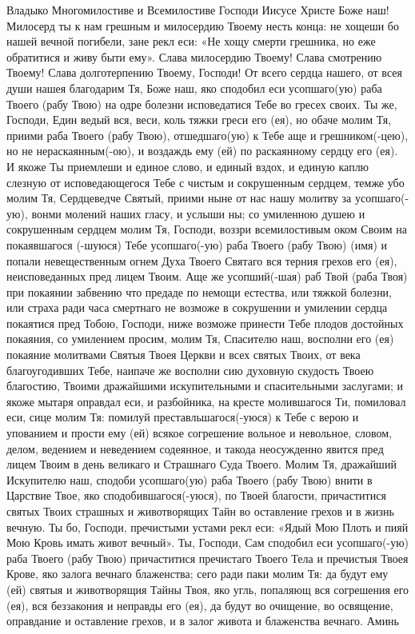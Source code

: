 \begin{mymulticols}


Владыко Многомилостиве и Всемилостиве Господи Иисусе Христе Боже наш! Милосерд ты к нам грешным и милосердию Твоему несть конца: не хощеши бо нашей вечной погибели, зане рекл еси: «Не хощу смерти грешника, но еже обратитися и живу быти ему». Слава милосердию Твоему! Слава смотрению Твоему! Слава долготерпению Твоему, Господи! От всего сердца нашего, от всея души нашея благодарим Тя, Боже наш, яко сподобил еси усопшаго(ую) раба Твоего (рабу Твою)  на одре болезни исповедатися Тебе во гресех своих. Ты же, Господи, Един ведый вся, веси, коль тяжки греси его (ея), но обаче молим Тя, приими раба Твоего (рабу Твою), отшедшаго(ую) к Тебе аще и грешником(-цею), но не нераскаянным(-ою), и воздаждь ему (ей) по раскаянному сердцу его (ея). И якоже Ты приемлеши и единое слово, и единый вздох, и единую каплю слезную от исповедающегося Тебе с чистым и сокрушенным сердцем, темже убо молим Тя, Сердцеведче Святый, приими ныне от нас нашу молитву за усопшаго(-ую), вонми молений наших гласу, и услыши ны; со умиленною душею и сокрушенным сердцем молим Тя, Господи, воззри всемилостивым оком Своим на покаявшагося (-шуюся) Тебе усопшаго(-ую) раба Твоего (рабу Твою) (имя) и попали невещественным огнем Духа Твоего Святаго вся терния грехов его (ея), неисповеданных пред лицем Твоим. Аще же усопший(-шая) раб Твой (раба Твоя) при покаянии забвению что предаде по немощи естества, или тяжкой болезни, или страха ради часа смертнаго не возможе в сокрушении и умилении сердца покаятися пред Тобою, Господи, ниже возможе принести Тебе плодов достойных покаяния, со умилением просим, молим Тя, Спасителю наш, восполни его (ея) покаяние молитвами Святыя Твоея Церкви и всех святых Твоих, от века благоугодивших Тебе, наипаче же восполни сию духовную скудость Твоею благостию, Твоими дражайшими искупительными и спасительными заслугами; и якоже мытаря оправдал еси, и разбойника, на кресте молившагося Ти, помиловал еси, сице молим Тя: помилуй преставльшагося(-уюся) к Тебе с верою и упованием и прости ему (ей) всякое согрешение вольное и невольное, словом, делом, ведением и неведением содеянное, и такода неосужденно явится пред лицем Твоим в день великаго и Страшнаго Суда Твоего. Молим Тя, дражайший Искупителю наш, сподоби усопшаго(ую) раба Твоего (рабу Твою)  внити в Царствие Твое, яко сподобившагося(-уюся), по Твоей благости, причаститися святых Твоих страшных и животворящих Тайн во оставление грехов и в жизнь вечную. Ты бо, Господи, пречистыми устами рекл еси: «Ядый Мою Плоть и пияй Мою Кровь имать живот вечный». Ты, Господи, Сам сподобил еси усопшаго(-ую) раба Твоего (рабу Твою) причаститися пречистаго Твоего Тела и пречистыя Твоея Крове, яко залога вечнаго блаженства; сего ради паки молим Тя: да будут ему (ей) святыя и животворящия Тайны Твоя, яко угль, попаляющ вся согрешения его (ея), вся беззакония и неправды его (ея), да будут во очищение, во освящение, оправдание и оставление грехов, и в залог живота и блаженства вечнаго. Аминь 

\end{mymulticols}

